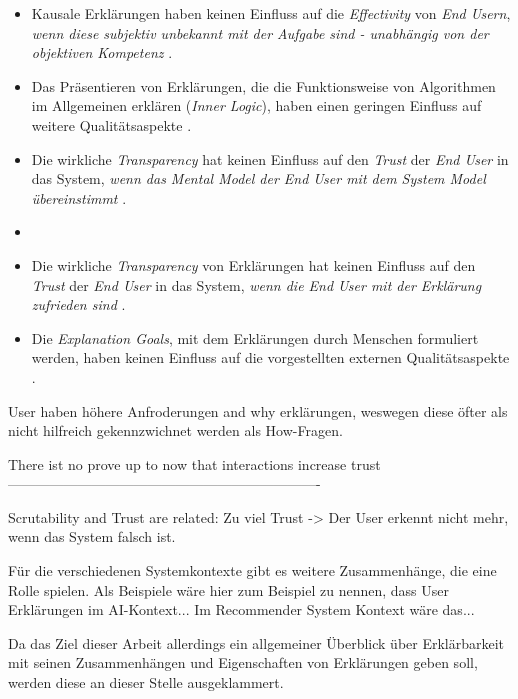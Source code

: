 \begin{itemize}
    \item Kausale Erklärungen haben keinen Einfluss auf die \textit{Effectivity} von \textit{End Usern}, \textit{wenn diese subjektiv unbekannt mit der Aufgabe sind - unabhängig von der objektiven Kompetenz} \cite{schaffer_i_2019}.
    \item Das Präsentieren von Erklärungen, die die Funktionsweise von Algorithmen im Allgemeinen erklären (\textit{Inner Logic}), haben einen geringen Einfluss auf weitere Qualitätsaspekte \cite{chazette_end-users_nodate}.
    \item Die wirkliche \textit{Transparency} hat keinen Einfluss auf den \textit{Trust} der \textit{End User} in das System, \textit{wenn das Mental Model der End User mit dem System Model übereinstimmt} \cite{eiband_impact_2019, riveiro_thats_2021}.
    \item \item Die wirkliche \textit{Transparency} von Erklärungen hat keinen Einfluss auf den \textit{Trust} der \textit{End User} in das System, \textit{wenn die End User mit der Erklärung zufrieden sind} \cite{eiband_impact_2019, riveiro_thats_2021}.
    \item Die \textit{Explanation Goals}, mit dem Erklärungen durch Menschen formuliert werden, haben keinen Einfluss auf die vorgestellten externen Qualitätsaspekte \cite{balog_measuring_2020}.
\end{itemize}


User haben höhere Anfroderungen and why erklärungen, weswegen diese öfter als nicht hilfreich gekennzwichnet werden als How-Fragen. \cite{lim_2009_assessing}

There ist no prove up to now that interactions increase trust \cite{cheng2019explaining}
-------------------------------------------------------------------

Scrutability and Trust are related: Zu viel Trust -> Der User erkennt nicht mehr, wenn das System falsch ist. \cite{gunning2019darpa}

Für die verschiedenen Systemkontexte gibt es weitere Zusammenhänge, die eine Rolle spielen. Als Beispiele wäre hier zum Beispiel zu nennen, dass User Erklärungen im AI-Kontext... Im Recommender System Kontext wäre das...

Da das Ziel dieser Arbeit allerdings ein allgemeiner Überblick über Erklärbarkeit mit seinen Zusammenhängen und Eigenschaften von Erklärungen geben soll, werden diese an dieser Stelle ausgeklammert.


